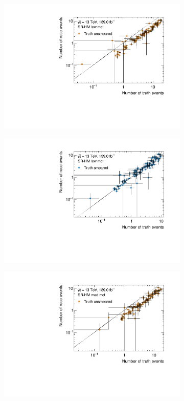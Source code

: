 \begin{figure}
	\centering
	\begin{subfigure}[b]{0.49\linewidth}
		\centering\includegraphics[width=\textwidth]{yields_SR-HM_low_mct_unsmeared}
	\end{subfigure}\hfill
	\begin{subfigure}[b]{0.49\linewidth}
		\centering\includegraphics[width=\textwidth]{yields_SR-HM_low_mct_smeared}
	\end{subfigure}\hfill
	\begin{subfigure}[b]{0.49\linewidth}
		\centering\includegraphics[width=\textwidth]{yields_SR-HM_med_mct_unsmeared}

\end{subfigure}
\end{figure}

